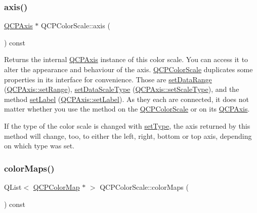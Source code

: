 \subsubsection{\texorpdfstring{axis()}{axis()}}
{\footnotesize\ttfamily \hyperlink{class_q_c_p_axis}{Q\+C\+P\+Axis} $\ast$ Q\+C\+P\+Color\+Scale\+::axis (\begin{DoxyParamCaption}{ }\end{DoxyParamCaption}) const\hspace{0.3cm}{\ttfamily [inline]}}

Returns the internal \hyperlink{class_q_c_p_axis}{Q\+C\+P\+Axis} instance of this color scale. You can access it to alter the appearance and behaviour of the axis. \hyperlink{class_q_c_p_color_scale}{Q\+C\+P\+Color\+Scale} duplicates some properties in its interface for convenience. Those are \hyperlink{class_q_c_p_color_scale_abe88633003a26d1e756aa74984587fef}{set\+Data\+Range} (\hyperlink{class_q_c_p_axis_aebdfea5d44c3a0ad2b4700cd4d25b641}{Q\+C\+P\+Axis\+::set\+Range}), \hyperlink{class_q_c_p_color_scale_aeb6107d67dd7325145b2498abae67fc3}{set\+Data\+Scale\+Type} (\hyperlink{class_q_c_p_axis_adef29cae617af4f519f6c40d1a866ca6}{Q\+C\+P\+Axis\+::set\+Scale\+Type}), and the method \hyperlink{class_q_c_p_color_scale_aee124ae8396320cacf8276e9a0fbb8ce}{set\+Label} (\hyperlink{class_q_c_p_axis_a33bcc382c111c9f31bb0687352a2dea4}{Q\+C\+P\+Axis\+::set\+Label}). As they each are connected, it does not matter whether you use the method on the \hyperlink{class_q_c_p_color_scale}{Q\+C\+P\+Color\+Scale} or on its \hyperlink{class_q_c_p_axis}{Q\+C\+P\+Axis}.

If the type of the color scale is changed with \hyperlink{class_q_c_p_color_scale_a1bf9bdb291927c422dd66b404b206f1f}{set\+Type}, the axis returned by this method will change, too, to either the left, right, bottom or top axis, depending on which type was set. \mbox{\label{class_q_c_p_color_scale_a556adc6b0216ebc1cc4317c541956d06}} 
\subsubsection{\texorpdfstring{color\+Maps()}{colorMaps()}}
{\footnotesize\ttfamily Q\+List$<$ \hyperlink{class_q_c_p_color_map}{Q\+C\+P\+Color\+Map} $\ast$ $>$ Q\+C\+P\+Color\+Scale\+::color\+Maps (\begin{DoxyParamCaption}{ }\end{DoxyParamCaption}) const}

